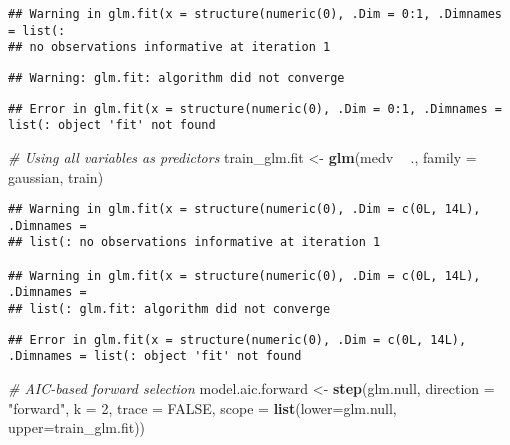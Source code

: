 \documentclass[]{article}
\newenvironment{Shaded}{\begin{snugshade}}{\end{snugshade}}
\newcommand{\CommentTok}[1]{\textcolor[rgb]{0.56,0.35,0.01}{\textit{#1}}}
\newcommand{\DataTypeTok}[1]{\textcolor[rgb]{0.13,0.29,0.53}{#1}}
\newcommand{\DecValTok}[1]{\textcolor[rgb]{0.00,0.00,0.81}{#1}}
\newcommand{\KeywordTok}[1]{\textcolor[rgb]{0.13,0.29,0.53}{\textbf{#1}}}
\newcommand{\NormalTok}[1]{#1}
\newcommand{\OperatorTok}[1]{\textcolor[rgb]{0.81,0.36,0.00}{\textbf{#1}}}
\newcommand{\OtherTok}[1]{\textcolor[rgb]{0.56,0.35,0.01}{#1}}
\newcommand{\StringTok}[1]{\textcolor[rgb]{0.31,0.60,0.02}{#1}}
\begin{document}
\begin{verbatim}
## Warning in glm.fit(x = structure(numeric(0), .Dim = 0:1, .Dimnames = list(:
## no observations informative at iteration 1
\end{verbatim}

\begin{verbatim}
## Warning: glm.fit: algorithm did not converge
\end{verbatim}

\begin{verbatim}
## Error in glm.fit(x = structure(numeric(0), .Dim = 0:1, .Dimnames = list(: object 'fit' not found
\end{verbatim}

\begin{Shaded}
\begin{Highlighting}[]
\CommentTok{# Using all variables as predictors}
\NormalTok{train_glm.fit <-}\StringTok{ }\KeywordTok{glm}\NormalTok{(medv }\OperatorTok{~}\StringTok{ }\NormalTok{., }\DataTypeTok{family =}\NormalTok{ gaussian, train)}
\end{Highlighting}
\end{Shaded}

\begin{verbatim}
## Warning in glm.fit(x = structure(numeric(0), .Dim = c(0L, 14L), .Dimnames =
## list(: no observations informative at iteration 1

## Warning in glm.fit(x = structure(numeric(0), .Dim = c(0L, 14L), .Dimnames =
## list(: glm.fit: algorithm did not converge
\end{verbatim}

\begin{verbatim}
## Error in glm.fit(x = structure(numeric(0), .Dim = c(0L, 14L), .Dimnames = list(: object 'fit' not found
\end{verbatim}

\begin{Shaded}
\begin{Highlighting}[]
\CommentTok{# AIC-based forward selection}
\NormalTok{model.aic.forward <-}\StringTok{ }\KeywordTok{step}\NormalTok{(glm.null, }\DataTypeTok{direction =} \StringTok{"forward"}\NormalTok{, }\DataTypeTok{k =} \DecValTok{2}\NormalTok{, }\DataTypeTok{trace =} \OtherTok{FALSE}\NormalTok{,}
                          \DataTypeTok{scope =} \KeywordTok{list}\NormalTok{(}\DataTypeTok{lower=}\NormalTok{glm.null, }\DataTypeTok{upper=}\NormalTok{train_glm.fit))}
\end{Highlighting}
\end{Shaded}
\end{document}
